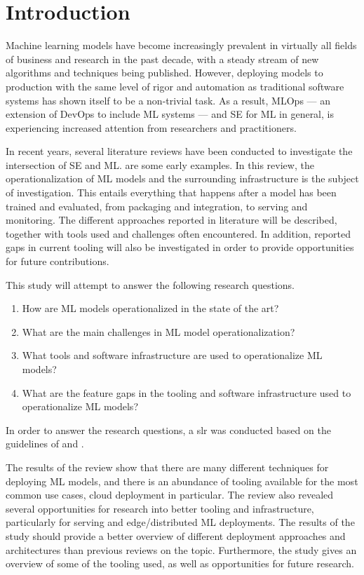 \chapter{Introduction}
\label{ch:introduction}
Machine learning models have become increasingly prevalent in virtually all fields of business and research in the past decade, with a steady stream of new algorithms and techniques being published.
However, deploying models to production with the same level of rigor and automation as traditional software systems has shown itself to be a non-trivial task.
As a result, MLOps --- an extension of DevOps to include ML systems --- and SE for ML in general, is experiencing increased attention from researchers and practitioners.

In recent years, several literature reviews have been conducted to investigate the intersection of SE and ML.
\cite{Baier2019, Kumeno2020} are some early examples.
In this review, the operationalization of ML models and the surrounding infrastructure is the subject of investigation.
This entails everything that happens after a model has been trained and evaluated, from packaging and integration, to serving and monitoring.
The different approaches reported in literature will be described, together with tools used and challenges often encountered.
In addition, reported gaps in current tooling will also be investigated in order to provide opportunities for future contributions.

This study will attempt to answer the following research questions.
\begin{enumerate}
    \item How are ML models operationalized in the state of the art?
    \item What are the main challenges in ML model operationalization?
    \item What tools and software infrastructure are used to operationalize ML models?
    \item What are the feature gaps in the tooling and software infrastructure used to operationalize ML models?
\end{enumerate}
In order to answer the research questions, a \acrfull{slr} was conducted based on the guidelines of \cite{Kitchenham07guidelinesfor} and \cite{Wohlin2014}.

The results of the review show that there are many different techniques for deploying ML models, and there is an abundance of tooling available for the most common use cases, cloud deployment in particular.
The review also revealed several opportunities for research into better tooling and infrastructure, particularly for serving and edge/distributed ML deployments.
The results of the study should provide a better overview of different deployment approaches and architectures than previous reviews on the topic.
Furthermore, the study gives an overview of some of the tooling used, as well as opportunities for future research.

